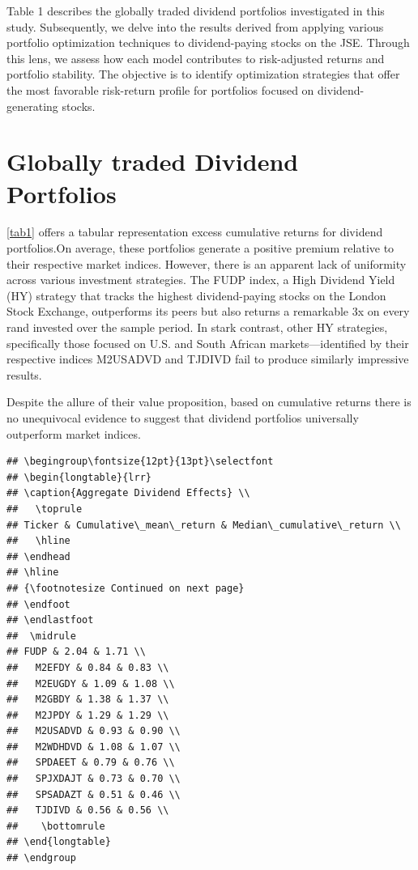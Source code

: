 \documentclass[12pt,preprint, authoryear]{elsarticle}
\numberwithin{equation}{section}
\numberwithin{figure}{section}
\numberwithin{table}{section}
\begin{document}
Table 1 describes the globally traded dividend portfolios investigated
in this study. Subsequently, we delve into the results derived from
applying various portfolio optimization techniques to dividend-paying
stocks on the JSE. Through this lens, we assess how each model
contributes to risk-adjusted returns and portfolio stability. The
objective is to identify optimization strategies that offer the most
favorable risk-return profile for portfolios focused on
dividend-generating stocks.

\hypertarget{globally-traded-dividend-portfolios}{%
\section{Globally traded Dividend
Portfolios}\label{globally-traded-dividend-portfolios}}

\ref{tab1} offers a tabular representation excess cumulative returns for
dividend portfolios.On average, these portfolios generate a positive
premium relative to their respective market indices. However, there is
an apparent lack of uniformity across various investment strategies. The
FUDP index, a High Dividend Yield (HY) strategy that tracks the highest
dividend-paying stocks on the London Stock Exchange, outperforms its
peers but also returns a remarkable 3x on every rand invested over the
sample period. In stark contrast, other HY strategies, specifically
those focused on U.S. and South African markets---identified by their
respective indices M2USADVD and TJDIVD fail to produce similarly
impressive results.

Despite the allure of their value proposition, based on cumulative
returns there is no unequivocal evidence to suggest that dividend
portfolios universally outperform market indices.

\begin{verbatim}
## \begingroup\fontsize{12pt}{13pt}\selectfont
## \begin{longtable}{lrr}
## \caption{Aggregate Dividend Effects} \\ 
##   \toprule
## Ticker & Cumulative\_mean\_return & Median\_cumulative\_return \\ 
##   \hline 
## \endhead 
## \hline 
## {\footnotesize Continued on next page} 
## \endfoot 
## \endlastfoot 
##  \midrule
## FUDP & 2.04 & 1.71 \\ 
##   M2EFDY & 0.84 & 0.83 \\ 
##   M2EUGDY & 1.09 & 1.08 \\ 
##   M2GBDY & 1.38 & 1.37 \\ 
##   M2JPDY & 1.29 & 1.29 \\ 
##   M2USADVD & 0.93 & 0.90 \\ 
##   M2WDHDVD & 1.08 & 1.07 \\ 
##   SPDAEET & 0.79 & 0.76 \\ 
##   SPJXDAJT & 0.73 & 0.70 \\ 
##   SPSADAZT & 0.51 & 0.46 \\ 
##   TJDIVD & 0.56 & 0.56 \\ 
##    \bottomrule
## \end{longtable}
## \endgroup
\end{verbatim}
\end{document}
